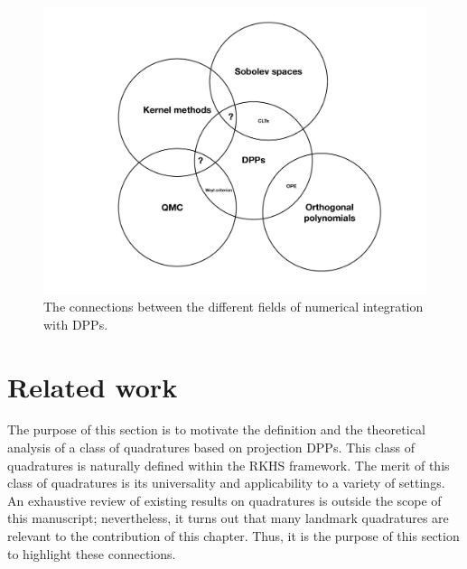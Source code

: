 \documentclass[twoside,11pt]{book}
\numberwithin{theorem}{chapter}
\numberwithin{definition}{chapter}
\numberwithin{proposition}{chapter}
\numberwithin{corollary}{chapter}
\numberwithin{example}{chapter}
\numberwithin{lemma}{chapter}
\numberwithin{assumption}{chapter}
\begin{document}
 

\begin{figure}[]
    \centering
\includegraphics[width= 1\textwidth]{img/big_picture_opt}
\caption{The connections between the different fields of numerical integration with DPPs.
\label{fig:big_picture_kqdpp}}
\end{figure}

\section{Related work}\label{sec:related_work_quadratures}
The purpose of this section is to motivate the definition and the theoretical analysis of a class of quadratures based on projection DPPs. This class of quadratures is naturally defined within the RKHS framework. The merit of this class of quadratures is its universality and applicability to a variety of settings. An exhaustive review of existing results on quadratures is outside the scope of this manuscript; nevertheless, it turns out that many landmark quadratures are relevant to the contribution of this chapter. 
Thus, it is the purpose of this section to highlight these connections.





\end{document}
